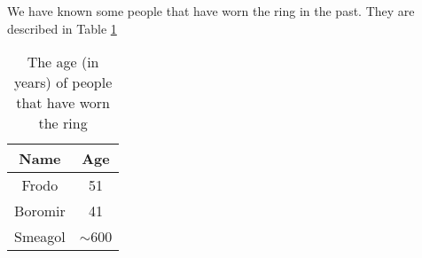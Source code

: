 We have known some people that have worn the ring in the past. They are described in Table \ref{tab:ring_and_age}

\begin{table}[hb]
\centering
\begin{tabular}{cc}
\hline
Name    & Age       \\ \hline
Frodo   & 51        \\
Boromir & 41        \\
Smeagol & $\sim$600 \\ \hline
\end{tabular}
\caption{The age (in years) of people that have worn the ring}
\label{tab:ring_and_age}
\end{table}